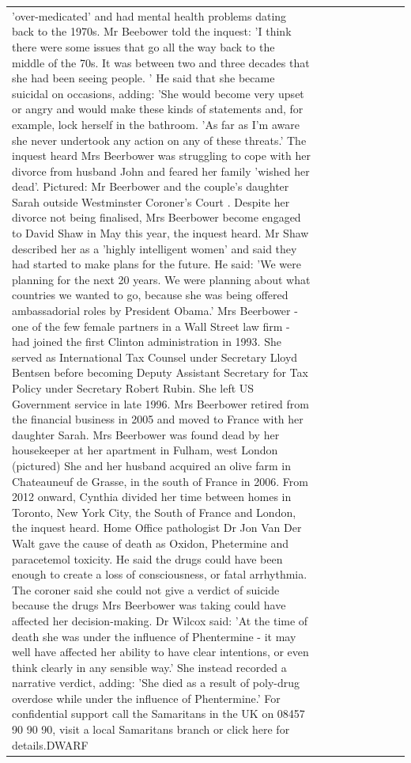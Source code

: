 \begin{table}[H]
\begin{tabular}{lllrlllll}
'over-medicated' and had mental health problems dating back to the 1970s. Mr Beebower told the inquest: 'I think there were some issues that go all the way back to the middle of the 70s. It was between two and three decades that she had been seeing people. ' He said that she became suicidal on occasions, adding: 'She would become very upset or angry and would make these kinds of statements and, for example, lock herself in the bathroom. 'As far as I'm aware she never undertook any action on any of these threats.' The inquest heard Mrs Beerbower was struggling to cope with her divorce from husband John and feared her family 'wished her dead'. Pictured: Mr Beerbower and the couple's daughter Sarah outside Westminster Coroner's Court . Despite her divorce not being finalised, Mrs Beerbower become engaged to David Shaw in May this year, the inquest heard. Mr Shaw described her as a 'highly intelligent women' and said they had started to make plans for the future. He said: 'We were planning for the next 20 years. We were planning about what countries we wanted to go, because she was being offered ambassadorial roles by President Obama.' Mrs Beerbower - one of the few female partners in a Wall Street law firm - had joined the first Clinton administration in 1993. She served as International Tax Counsel under Secretary Lloyd Bentsen before becoming Deputy Assistant Secretary for Tax Policy under Secretary Robert Rubin. She left US Government service in late 1996. Mrs Beerbower retired from the financial business in 2005 and moved to France with her daughter Sarah. Mrs Beerbower was found dead by her housekeeper at her apartment in Fulham, west London (pictured) She and her husband acquired an olive farm in Chateauneuf de Grasse, in the south of France in 2006. From 2012 onward, Cynthia divided her time between homes in Toronto, New York City, the South of France and London, the inquest heard. Home Office pathologist Dr Jon Van Der Walt gave the cause of death as Oxidon, Phetermine and paracetemol toxicity. He said the drugs could have been enough to create a loss of consciousness, or fatal arrhythmia. The coroner said she could not give a verdict of suicide because the drugs Mrs Beerbower was taking could have affected her decision-making. Dr Wilcox said: 'At the time of death she was under the influence of Phentermine - it may well have affected her ability to have clear intentions, or even think clearly in any sensible way.' She instead recorded a narrative verdict, adding: 'She died as a result of poly-drug overdose while under the influence of Phentermine.' For confidential support call the Samaritans in the UK on 08457 90 90 90, visit a local Samaritans branch or click here for details.DWARF \\

\end{tabular}
\end{table}
